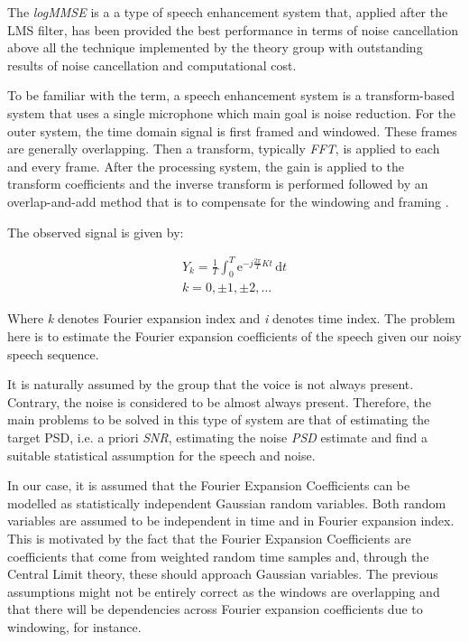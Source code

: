 \documentclass[11pt,a4paper,english]{book}  %
\theoremstyle{definition}  %
\theoremstyle{plain}  %
\theoremstyle{remark}  %
\begin{document}
The \textit{logMMSE} is a a type of speech enhancement system that, applied after the LMS filter, has been provided the best performance in terms of noise cancellation above all the technique implemented by the theory group with outstanding results of noise cancellation and computational cost.
	
	To be familiar with the term, a speech enhancement system is a transform-based system that uses a single microphone which main goal is noise reduction. For the outer system, the time domain signal is first framed and windowed.  These frames are generally overlapping. Then a transform, typically \textit{FFT}, is applied to each and every frame. After the processing system, the gain is applied to the transform coefficients and the inverse transform is performed followed by an overlap-and-add method that is to compensate for the windowing and framing \cite{speech}.

	
	The observed signal is given by:

	\begin{subequations}
	\label{eq:speech1}
	\begin{align}
	Y_{k}=\frac{1}{T} \int_0^T \mathrm{e}^{-j \frac{2\pi}{T} Kt}\,\mathrm{d}t\\
	k=0, \pm 1, \pm 2, \dots	
	\end{align}
	
	\end{subequations}
	
	
	Where \textit{k} denotes Fourier expansion index and \textit{i} denotes time index. The problem here is to estimate the Fourier expansion coefficients of the speech given our noisy speech sequence.

It is naturally assumed by the group that the voice is not always present. Contrary, the noise is considered to be almost always present. Therefore, the main problems to be solved in this type of system are that of estimating the target PSD, i.e. a priori \textit{SNR}, estimating the noise \textit{PSD} estimate and find a suitable statistical assumption for the speech and noise.


In our case, it is assumed that the Fourier Expansion Coefficients can be modelled as statistically independent Gaussian random variables. Both random variables are assumed to be independent in time and in Fourier expansion index. This is motivated by the fact that the Fourier Expansion Coefficients are coefficients that come from weighted random time samples and, through the Central Limit theory, these should approach Gaussian variables. The previous assumptions might not be entirely correct as the windows are overlapping and that there will be dependencies across Fourier expansion coefficients due to windowing, for instance.
\end{document}
